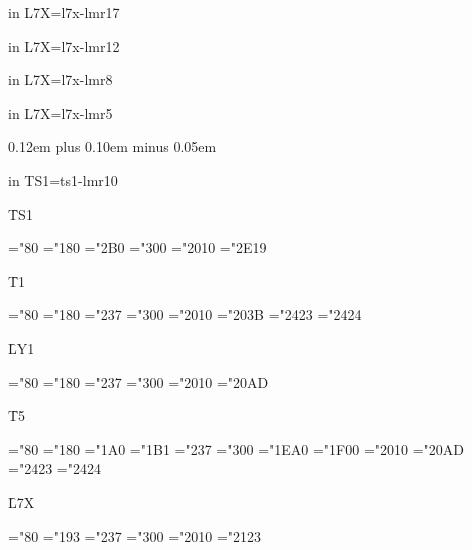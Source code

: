 \font in L7X\LsvnXZZZRegularA=l7x-lmr17
\LsvnXZZZRegularA
\TextI

\font in L7X\LsvnXZZZRegularA=l7x-lmr12
\LsvnXZZZRegularA
\TextI

\font in L7X\LsvnXZZZRegularA=l7x-lmr8
\LsvnXZZZRegularA
\TextI

\font in L7X\LsvnXZZZRegularA=l7x-lmr5
\LsvnXZZZRegularA
\TextI


\vfil
\eject
\spaceskip 0.12em plus 0.10em minus 0.05em

\font in TS1\TSoneZZZRegular=ts1-lmr10

{\f TS1}

\TSoneZZZRegular
\ChrA="80 \ChrB="180
\PrintCode
\ChrA="2B0 \ChrB="300
\PrintCode
\ChrA="2010 \ChrB="2E19
\PrintCode

{\f T1}

\ToneZZZRegular
\ChrA="80 \ChrB="180
\PrintCode
\ChrA="237 \ChrB="300
\PrintCode
\ChrA="2010 \ChrB="203B
\PrintCode
\ChrA="2423 \ChrB="2424
\PrintCode

{\f LY1}

\LYoneZZZRegular
\ChrA="80 \ChrB="180
\PrintCode
\ChrA="237 \ChrB="300
\PrintCode
\ChrA="2010 \ChrB="20AD
\PrintCode

{\f T5}

\TfiveZZZRegular
\ChrA="80 \ChrB="180
\PrintCode
\ChrA="1A0 \ChrB="1B1
\PrintCode
\ChrA="237 \ChrB="300
\PrintCode
\ChrA="1EA0 \ChrB="1F00
\PrintCode
\ChrA="2010 \ChrB="20AD
\PrintCode
\ChrA="2423 \ChrB="2424
\PrintCode


{\f L7X}

\LsvnXZZZRegular
\ChrA="80 \ChrB="193
\PrintCode
\ChrA="237 \ChrB="300
\PrintCode
\ChrA="2010 \ChrB="2123
\PrintCode


\bye
